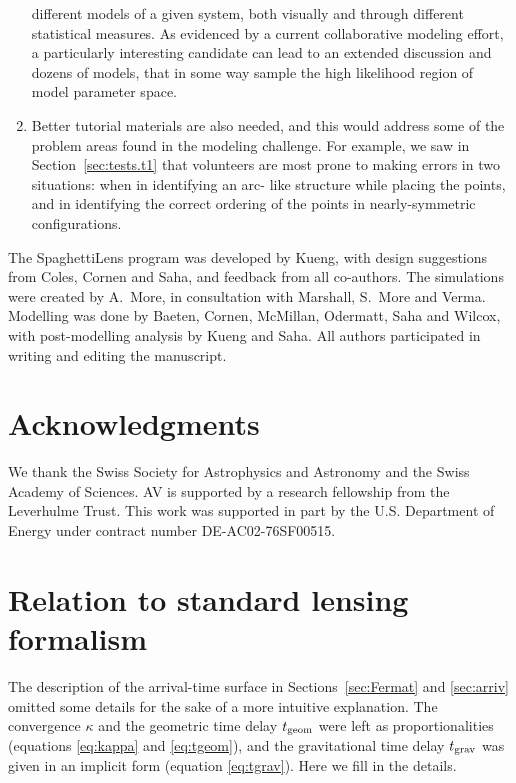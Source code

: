 \documentclass[usenatbib]{mn2e}
\newcommand{\spl}{SpaghettiLens\xspace}
\newcommand{\secref}[1]{Section~\ref{sec:#1}}
\begin{document}
\begin{enumerate}
  different models of a given system, both visually and through
  different statistical measures.  As evidenced by a current
  collaborative modeling effort, a particularly interesting candidate
  can lead to an extended discussion and dozens of models, that
  in some way sample the high likelihood region of model parameter
  space.
\item Better tutorial materials are also needed, and this would
  address some of the problem areas found in the modeling challenge.
  For example, we saw in \secref{tests.t1} that volunteers are most
  prone to making errors in two situations: when in identifying an arc-
  like structure while placing the points, and in identifying the
  correct ordering of the points in nearly-symmetric configurations.
\end{enumerate}

The \spl program was developed by Kueng, with design suggestions from
Coles, Cornen and Saha, and feedback from all co-authors.  The
simulations were created by A.~More, in consultation with Marshall,
S.~More and Verma.  Modelling was done by Baeten, Cornen, McMillan,
Odermatt, Saha and Wilcox, with post-modelling analysis by Kueng and
Saha.  All authors participated in writing and editing the manuscript.



\section*{Acknowledgments}

We thank the Swiss Society for Astrophysics and Astronomy and the
Swiss Academy of Sciences. AV is supported by a research fellowship
from the Leverhulme Trust. This work was supported in part by the U.S.
Department of Energy under contract number DE-AC02-76SF00515.


\appendix

\section{Relation to standard lensing formalism}\label{more-theory}

The description of the arrival-time surface in
Sections~\ref{sec:Fermat} and \ref{sec:arriv} omitted some details for
the sake of a more intuitive explanation.  The convergence $\kappa$
and the geometric time delay $t_{\rm geom}$ were left as
proportionalities (equations \ref{eq:kappa} and \ref{eq:tgeom}), and
the gravitational time delay $t_{\rm grav}$ was given in an implicit
form (equation \ref{eq:tgrav}).  Here we fill in the details.
\end{document}
